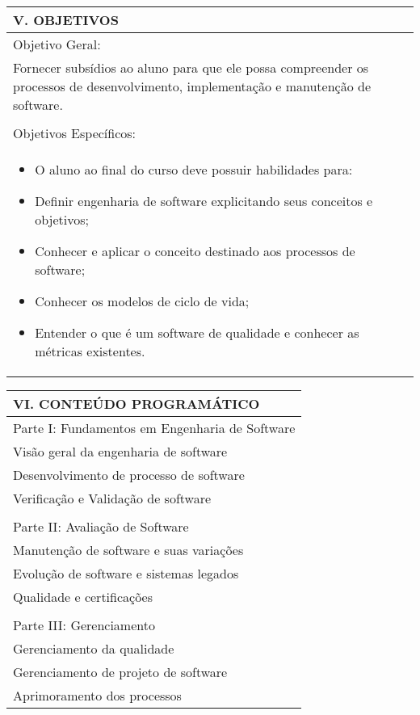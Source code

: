 \documentclass[12pt]{article}
\begin{document}
\begin{longtable}{|L{1.025\textwidth}|} \hline
%
{\bf V. OBJETIVOS } \\ \hline
%
Objetivo Geral:\\

Fornecer subsídios ao aluno para que ele possa compreender os processos de desenvolvimento, implementação e manutenção de software.\\
\\
Objetivos Específicos:\\
\begin{itemize}
\item O aluno ao final do curso deve possuir habilidades para:
\item Definir engenharia de software explicitando seus conceitos e objetivos; 
\item Conhecer e aplicar o conceito destinado aos processos de software; 
\item Conhecer os modelos de ciclo de vida;
\item Entender o que é um software de qualidade e conhecer as métricas existentes.
\end{itemize}
\\ \hline
\end{longtable}


\begin{longtable}{|L{1.025\textwidth}|} \hline
%
{\bf VI. CONTEÚDO PROGRAMÁTICO } \\ \hline
Parte I: Fundamentos em Engenharia de Software\\
Visão geral da engenharia de software\\
Desenvolvimento de processo de software\\
Verificação e Validação de software\\
\\
Parte II: Avaliação de Software\\
Manutenção de software e suas variações\\
Evolução de software e sistemas legados\\
Qualidade e certificações\\
\\
Parte III: Gerenciamento\\
Gerenciamento da qualidade\\
Gerenciamento de projeto de software\\
Aprimoramento dos processos
\\ \hline
\end{longtable} 
\end{document}
